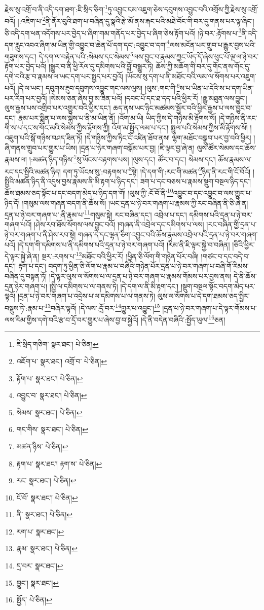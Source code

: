 རྗེས་སུ་འགྲོ་བ་ནི་འདི་དག་ཐག་:ཇི་སྲིད་ཅིག་\footnote{ཇི་སྲིད་གཅིག་  སྣར་ཐང་།  པེ་ཅིན། }ཏུ་འབྱུང་ངམ་འཇུག་ཅེས་དབུགས་འབྱུང་བའི་འགྲོས་ཀྱི་རྗེས་སུ་འགྲོ་བའོ། །:འཇིག་པ་\footnote{འཇོག་པ་  སྣར་ཐང་། འགྲོ་བ་  པེ་ཅིན། }ནི་ནོར་བུའི་ཐག་པ་བཞིན་དུ་སྣའི་རྩེ་མོ་ནས་རྐང་པའི་མཐེ་བོང་གི་བར་དུ་གནས་པར་ལྟ་ཞིང་། ཅི་འདི་དག་ཕན་འདོགས་པར་བྱེད་པ་ཞིག་གམ་གནོད་པར་བྱེད་པ་ཞིག་ཅེས་རྟོག་པའོ། །ཉེ་བར་:རྟོགས་པ་\footnote{རྟོག་པ་  སྣར་ཐང་།  པེ་ཅིན། }ནི་འདི་དག་རླུང་འབའ་ཞིག་མ་ཡིན་གྱི་འབྱུང་བ་ཆེན་པོ་དག་དང་:འབྱུང་བ་དག་\footnote{འབྱུང་བ་  སྣར་ཐང་།  པེ་ཅིན། }ལས་མངོན་པར་གྲུབ་པ་རྒྱུར་བྱས་པའི་གཟུགས་དང་། དེ་དག་ལ་བརྟེན་པའི་:སེམས་དང་སེམས་\footnote{སེམས་  སྣར་ཐང་།  པེ་ཅིན། }ལས་བྱུང་བ་རྣམས་ཀྱང་ཡོད་དོ་ཞེས་ཕུང་པོ་ལྔ་ལ་ཉེ་བར་རྟོག་པར་བྱེད་པའོ། །སྒྱུར་བ་ནི་ཕྱི་རོལ་དུ་དམིགས་པའི་བློ་བསྒྱུར་ཏེ། ཆོས་ཀྱི་མཆོག་གི་བར་དུ་གོང་ནས་གོང་དུ་དགེ་བའི་རྩ་བ་རྣམས་ལ་ཡང་དག་པར་སྤྱད་པར་བྱའོ། །ཡོངས་སུ་དག་པ་ནི་མཐོང་བའི་ལམ་ལ་སོགས་པར་འཇུག་པའོ། །དེ་ལ་ཡང་། དབུགས་རྔུབ་དབུགས་འབྱུང་གང་ལས་ལུས། །ལུས་:གང་གི་\footnote{གང་གིས་  སྣར་ཐང་།  པེ་ཅིན། }ས་པ་ཡིན་པ་དེའི་ས་པ་དག་ཡིན་པར་རིག་པར་བྱའོ། །སེམས་ཅན་ཞེས་བྱ་མ་ཟིན་པའོ། །དབང་པོ་དང་ཐ་དད་པའི་ཕྱིར་རོ། །རྒྱུ་མཐུན་ལས་བྱུང་། ལུས་རྒྱས་པས་འགྲིབ་པར་འགྱུར་བའི་ཕྱིར་དང་། ཆད་ནས་ཡང་ཉིང་མཚམས་སྦྱོར་བའི་ཕྱིར་རྒྱས་པ་ལས་བྱུང་བ་དང་། རྣམ་པར་སྨིན་པ་ལས་སྐྱེས་པ་ནི་མ་ཡིན་ནོ། །འོག་མ་ཡི། ཡིད་ཀྱིས་དེ་གཉིས་མི་རྟོགས་སོ། །དེ་གཉིས་ནི་རང་གི་ས་པ་དང་ས་གོང་མའི་སེམས་ཀྱིས་རྟོགས་ཀྱི། འོག་མ་སྤྱོད་ལམ་པ་དང་། སྤྲུལ་པའི་སེམས་ཀྱིས་མི་རྟོགས་སོ། །འཇུག་པའི་སྒོ་གཉིས་བཤད་ཟིན་ཏོ། །དེ་གཉིས་ཀྱིས་ཏིང་ངེ་འཛིན་ཐོབ་ནས། ལྷག་མཐོང་བསྒྲུབ་པར་བྱ་བའི་ཕྱིར། །ཞི་གནས་གྲུབ་པར་གྱུར་པ་ཡིས། །དྲན་པ་ཉེར་གཞག་བསྒོམ་པར་བྱ། །ཇི་ལྟར་བྱ་ཞེ་ན། ལུས་ཚོར་སེམས་དང་ཆོས་རྣམས་ལ། །:མཚན་ཉིད་གཉིས་\footnote{མཚན་ཉིས་  པེ་ཅིན། }སུ་ཡོངས་བརྟགས་པས། །ལུས་དང་། ཚོར་བ་དང་། སེམས་དང་། ཆོས་རྣམས་ལ་རང་དང་སྤྱིའི་མཚན་ཉིད། དག་ཏུ་ཡོངས་སུ་:བརྟགས་པ་\footnote{རྟག་པ་  སྣར་ཐང་། རྟག་ས་  པེ་ཅིན། }སྟེ། །དེ་དག་གི་:རང་གི་མཚན་\footnote{རང་  སྣར་ཐང་།  པེ་ཅིན། }ཉིད་ནི་རང་གི་ངོ་བོའོ། །སྤྱིའི་མཚན་ཉིད་ནི་འདུས་བྱས་རྣམས་ནི་མི་རྟག་པ་ཉིད་དང་། ཟག་པ་དང་བཅས་པ་རྣམས་སྡུག་བསྔལ་ཉིད་དང་། ཆོས་ཐམས་ཅད་སྟོང་པ་དང་བདག་མེད་པ་ཉིད་དག་གོ། །ལུས་ཀྱི་:ངོ་བོ་ནི་\footnote{ངོ་བོ་  སྣར་ཐང་།  པེ་ཅིན། }འབྱུང་བ་དང་འབྱུང་བ་ལས་གྱུར་པ་ཉིད་དོ། །གསུམ་ལས་གཞན་བདག་ནི་ཆོས་སོ། །ཡང་དྲན་པ་ཉེ་བར་གཞག་པ་རྣམས་ཀྱི་རང་བཞིན་ནི་ཅི་ཞེ་ན། དྲན་པ་ཉེ་བར་གཞག་པ་:ནི་རྣམ་པ་\footnote{ནི་  སྣར་ཐང་།  པེ་ཅིན། }གསུམ་སྟེ། རང་བཞིན་དང་། འབྲེལ་པ་དང་། དམིགས་པའི་དྲན་པ་ཉེ་བར་གཞག་པའོ། །ཤེས་རབ་ཐོས་སོགས་ལས་བྱུང་བའོ། །གཞན་ནི་འབྲེལ་དང་དམིགས་པ་ལས། །རང་བཞིན་གྱི་དྲན་པ་ཉེ་བར་གཞག་པ་ནི་ཤེས་རབ་སྟེ། གཞན་དེ་དང་ལྷན་ཅིག་འབྱུང་བའི་ཆོས་རྣམས་འབྲེལ་པའི་དྲན་པ་ཉེ་བར་གཞག་པའོ། །དེ་དག་གི་དམིགས་པ་ནི་དམིགས་པའི་དྲན་པ་ཉེ་བར་གཞག་པའོ། །རིམ་ནི་ཇི་ལྟར་སྐྱེ་བ་བཞིན། །ཅིའི་ཕྱིར་དེ་ལྟར་སྐྱེ་ཞེ་ན། སྔར་:རགས་པ་\footnote{རག་པ་  སྣར་ཐང་། }མཐོང་བའི་ཕྱིར་རོ། །ཕྱིན་ཅི་ལོག་གི་གཉེན་པོར་བཞི། །གཙང་བ་དང་བདེ་བ་དང་། རྟག་པ་དང་། བདག་ཏུ་ཕྱིན་ཅི་ལོག་པ་རྣམ་པ་བཞིའི་གཉེན་པོར་དྲན་པ་ཉེ་བར་གཞག་པ་བཞི་གོ་རིམས་བཞིན་དུ་བསྟན་ཏོ། །དེ་ལྟར་ལུས་ལ་སོགས་པ་ལ་དྲན་པ་ཉེ་བར་གཞག་པ་རྣམས་གོམས་པར་བྱས་ནས། དེ་ནི་ཆོས་དྲན་ཉེར་གཞག་པ། །སྤྱི་ལ་དམིགས་པ་ལ་གནས་ཏེ། །དེ་དག་ལ་ནི་མི་རྟག་དང་། །སྡུག་བསྔལ་སྟོང་བདག་མེད་པར་ལྟའོ། །དྲན་པ་ཉེ་བར་གཞག་པ་འདྲེས་པ་ལ་དམིགས་པ་ལ་གནས་ཏེ། ལུས་ལ་སོགས་པ་དེ་དག་ཐམས་ཅད་སྤྱིར་བསྡུས་ཏེ་:རྣམ་པ་\footnote{རྣམ་  སྣར་ཐང་།  པེ་ཅིན། }བཞིར་ལྟའོ། །དེ་ལས་:དྲོ་བར་\footnote{དྲ་བར་  སྣར་ཐང་། }གྱུར་པ་འབྱུང་།\footnote{བྱུང་།  སྣར་ཐང་། } །དྲན་པ་ཉེ་བར་གཞག་པ་དེ་ལྟར་གོམས་པ་ལས་རིམ་གྱིས་དགེ་བའི་རྩ་བ་དྲོ་བར་གྱུར་པ་ཞེས་བྱ་བ་སྐྱེའོ། །དེ་ནི་བདེན་བཞིའི་:སྤྱོད་ཡུལ་\footnote{སྤྱོད་  པེ་ཅིན། }ཅན། 